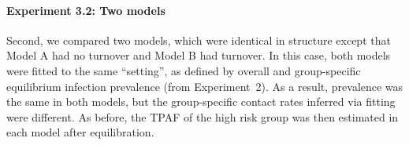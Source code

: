 \paragraph{Experiment 3.2: Two models}
\label{p:exp-tpaf-fit}
Second, we compared two models,
which were identical in structure except that
Model A had no turnover and Model B had turnover.
In this case, both models were fitted to
the same ``setting'', as defined by overall and group-specific equilibrium infection prevalence
(from Experiment~2).
As a result, prevalence was the same in both models,
but the group-specific contact rates inferred via fitting were different.
As before, the TPAF of the high risk group was then estimated
in each model after equilibration.
